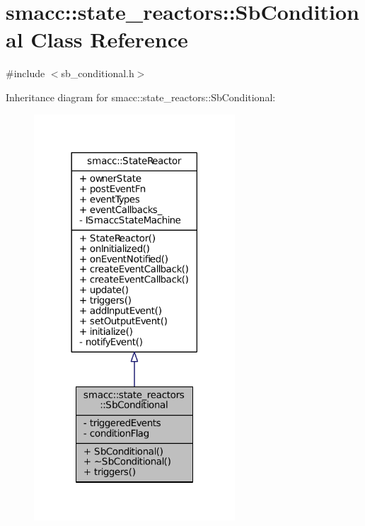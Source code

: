 \hypertarget{classsmacc_1_1state__reactors_1_1SbConditional}{}\section{smacc\+:\+:state\+\_\+reactors\+:\+:Sb\+Conditional Class Reference}
\label{classsmacc_1_1state__reactors_1_1SbConditional}


{\ttfamily \#include $<$sb\+\_\+conditional.\+h$>$}



Inheritance diagram for smacc\+:\+:state\+\_\+reactors\+:\+:Sb\+Conditional\+:
\nopagebreak
\begin{figure}[H]
\begin{center}
\leavevmode
\includegraphics[width=213pt]{classsmacc_1_1state__reactors_1_1SbConditional__inherit__graph}
\end{center}
\end{figure}


